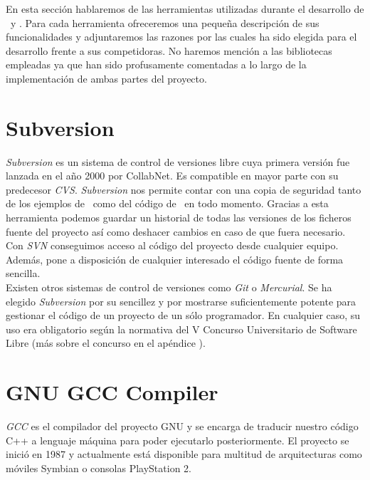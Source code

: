 En esta sección hablaremos de las herramientas utilizadas durante el desarrollo
de \wiki\ y \juego. Para cada herramienta ofreceremos una pequeña descripción
de sus funcionalidades y adjuntaremos las razones por las cuales ha sido
elegida para el desarrollo frente a sus competidoras. No haremos mención
a las bibliotecas empleadas ya que han sido profusamente comentadas a lo largo
de la implementación de ambas partes del proyecto.\\


\section*{Subversion}

\textit{Subversion} \cite{website:svn} es un sistema de control de
versiones libre cuya primera versión fue lanzada en el año 2000 por CollabNet.
Es compatible en mayor parte con su predecesor \textit{CVS}. \textit{Subversion}
nos permite contar con una copia de seguridad tanto de los ejemplos de
\wiki\ como del código de \juego\ en todo momento. Gracias a esta herramienta
podemos guardar un historial de todas las versiones de los ficheros
fuente del proyecto así como deshacer cambios en caso de que fuera necesario.
Con \textit{SVN} conseguimos acceso al código del proyecto desde cualquier
equipo. Además, pone a disposición de cualquier interesado el código fuente
de forma sencilla.\\

Existen otros sistemas de control de versiones como \textit{Git} o
\textit{Mercurial}. Se ha elegido \textit{Subversion} por su sencillez
y por mostrarse suficientemente potente para gestionar el código de un proyecto
de un sólo programador. En cualquier caso, su uso era obligatorio según la
normativa del V Concurso Universitario de Software Libre (más sobre
el concurso en el apéndice ).\\

\section*{GNU GCC Compiler}

\textit{GCC} \cite{website:gnu-gcc} es el compilador del proyecto GNU y se
encarga de traducir nuestro código C++ a lenguaje máquina para poder
ejecutarlo posteriormente. El proyecto se inició en 1987 y actualmente
está disponible para multitud de arquitecturas como móviles Symbian
o consolas PlayStation 2.\\

